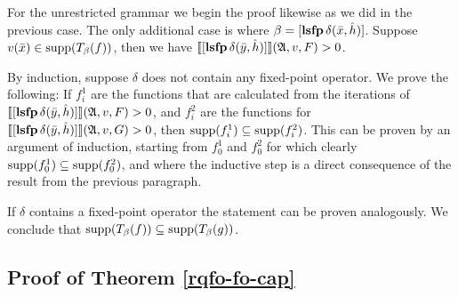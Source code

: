 \vspace{1em}
For the unrestricted grammar we begin the proof likewise as we did in the previous case. The only additional case is  where $\beta = [{\bf lsfp} \, \delta(\bar{x},\hat{h})]$. Suppose $v(\bar{x})\in\text{\rm supp}(T_{\beta}(f))$, then we have ${\llbracket{}{[{\bf lsfp} \, \delta(\bar{y},\hat{h})]}\rrbracket}(\mathfrak{A},v,F) > 0$. 

By induction, suppose $\delta$ does not contain any fixed-point operator. We prove the following: If $f^1_i$ are the functions that are calculated from the iterations of ${\llbracket{}{[{\bf lsfp} \, \delta(\bar{y},\hat{h})]}\rrbracket}(\mathfrak{A},v,F) > 0$, and $f^2_i$ are the functions for ${\llbracket{}{[{\bf lsfp} \, \delta(\bar{y},\hat{h})]}\rrbracket}(\mathfrak{A},v,G) > 0$, then $\text{\rm supp}(f^1_i)\subseteq\text{\rm supp}(f^2_i)$. This can be proven by an argument of induction, starting from $f^1_0$ and $f^2_0$ for which clearly $\text{\rm supp}(f^1_0) \subseteq \text{\rm supp}(f^2_0)$, and where the inductive step is a direct consequence of the result from the previous paragraph.

If $\delta$ contains a fixed-point operator the statement can be proven analogously. We conclude that $\text{\rm supp}(T_{\beta}(f))\subseteq\text{\rm supp}(T_{\beta}(g))$.

\subsection*{Proof of Theorem \ref{rqfo-fo-cap}}

